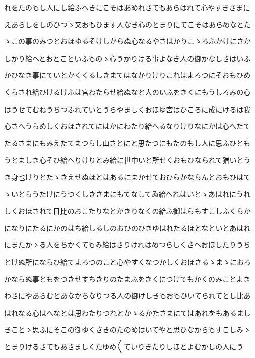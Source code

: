 \documentclass[a4paper,11pt,landscape]{ltjtarticle}
\begin{document}
れをたのもし人にし給ふへきにこそはあめれさてもあらはれて心やすきさまに
\par\medskip
えあらしをしのひつゝ又おもひます人なき心のとまりにてこそはあらめなとた
\par\medskip
ゝこの事のみつとおほゆるそけしからぬ心なるやさはかりこゝろふかけにさか
\par\medskip
しかり給へとおとこといふものゝ心うかりける事よなき人の御かなしさはいふ
\par\medskip
かひなき事にていとかくくるしきまてはなかりけりこれはよろつにそおもひめ
\par\medskip
くらされ給ひけるけふは宮わたらせ給ぬなと人のいふをきくにもうしろみの心
\par\medskip
はうせてむねうちつふれていとうらやましくおほゆ宮はひころに成にけるは我
\par\medskip
心さへうらめしくおほされてにはかにわたり給へるなりけりなにかは心へたて
\par\medskip
たるさまにもみえたてまつらし山さとにと思たつにもたのもし人に思ふひとも
\par\medskip
うとましき心そひ給へりけりとみ給に世中いと所せくおもひなられて猶いとう
\par\medskip
き身也けりとたゝきえせぬほとはあるにまかせておひらかならんとおもひはて
\par\medskip
ゝいとらうたけにうつくしきさまにもてなしてゐ給へれはいとゝあはれにうれ
\par\medskip
しくおほされて日比のおこたりなとかきりなくの給ふ御はらもすこしふくらか
\par\medskip
になりにたるにかのはち給しるしのおひのひきゆはれたるほとなといとあはれ
\par\medskip
にまたかゝる人をちかくてもみ給はさりけれはめつらしくさへおほしたりうち
\par\medskip
とけぬ所にならひ給てよろつのこと心やすくなつかしくおほさるゝまゝにおろ
\par\medskip
かならぬ事ともをつきせすちきりのたまふをきくにつけてもかくのみことよき
\par\medskip
わさにやあらむとあなかちなりつる人の御けしきもおもひいてられてとし比あ
\par\medskip
はれなる心はへなとは思わたりつれとかゝるかたさまにてはあれをもあるまし
\par\medskip
きことゝ思ふにそこの御ゆくさきのたのめはいてやと思ひなからもすこしみゝ
\par\medskip
とまりけるさてもあさましくたゆめ〱ていりきたりしほとよむかしの人にう
\par\medskip
\end{document}
